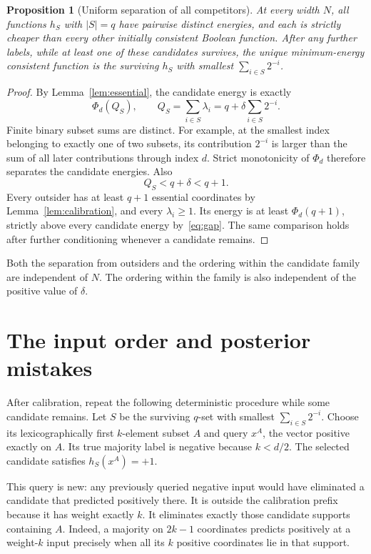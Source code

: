 \documentclass[11pt]{article}
\newtheorem{proposition}[theorem]{Proposition}
\begin{document}
\begin{proposition}[Uniform separation of all competitors]\label{prop:tier}
At every width $N$, all functions $h_S$ with $|S|=q$ have pairwise
distinct energies, and each is strictly cheaper than every other
initially consistent Boolean function. After any further labels,
while at least one of these candidates survives, the unique
minimum-energy consistent function is the surviving $h_S$ with
smallest $\sum_{i\in S}2^{-i}$.
\end{proposition}
\begin{proof}
By Lemma~\ref{lem:essential}, the candidate energy is exactly
\[
 \Phi_d(Q_S),\qquad
 Q_S=\sum_{i\in S}\lambda_i=q+\delta\sum_{i\in S}2^{-i}.
\]
Finite binary subset sums are distinct. For example, at the smallest
index belonging to exactly one of two subsets, its contribution
$2^{-i}$ is larger than the sum of all later contributions through
index $d$. Strict monotonicity of $\Phi_d$ therefore separates the
candidate energies. Also
\begin{equation}\label{eq:gap}
 Q_S<q+\delta<q+1.
\end{equation}
Every outsider has at least $q+1$ essential coordinates by
Lemma~\ref{lem:calibration}, and every $\lambda_i\ge1$.
Its energy is at least $\Phi_d(q+1)$, strictly above every candidate
energy by~\eqref{eq:gap}. The same comparison holds after further
conditioning whenever a candidate remains.
\end{proof}

Both the separation from outsiders and the ordering within the candidate
family are independent of $N$. The ordering within the family is also
independent of the positive value of $\delta$.

\section{The input order and posterior mistakes}

After calibration, repeat the following deterministic procedure while
some candidate remains. Let $S$ be the surviving $q$-set with smallest
$\sum_{i\in S}2^{-i}$. Choose its lexicographically first $k$-element
subset $A$ and query $x^A$, the vector positive exactly on $A$.
Its true majority label is negative because $k<d/2$.
The selected candidate satisfies $h_S(x^A)=+1$.

This query is new: any previously queried negative input would have
eliminated a candidate that predicted positively there. It is outside
the calibration prefix because it has weight exactly $k$.
It eliminates exactly those candidate supports containing $A$.
Indeed, a majority on $2k-1$ coordinates predicts positively at a
weight-$k$ input precisely when all its $k$ positive coordinates lie
in that support.
\end{document}
